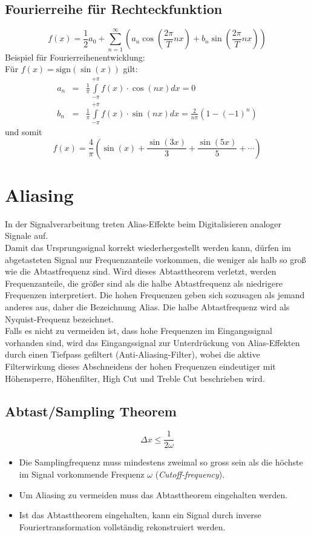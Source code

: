 \subsection{Fourierreihe für Rechteckfunktion}
$$f(x) = \frac{1}{2} a_0 + \sum\limits_{n=1}^{\infty} \left( a_n \cos( \frac{2 \pi}{T} nx) + b_n \sin (\frac{2 \pi}{T} nx) \right)$$
Beispiel für Fourierreihenentwicklung: \\
Für $f(x) = \textrm{sign}(\sin(x))$ gilt:
\begin{eqnarray*}
a_n &=& \frac{1}{\pi} \int\limits_{- \pi}^{+ \pi} f(x) \cdot \cos(nx) dx = 0 \\
b_n &=& \frac{1}{\pi} \int\limits_{- \pi}^{+ \pi} f(x) \cdot \sin(nx) dx = \frac{2}{n \pi} (1 - (-1)^n)
\end{eqnarray*}
und somit $$f(x) = \frac{4}{\pi} \left( \sin(x) + \frac{\sin(3x)}{3} + \frac{\sin(5x)}{5} + \cdots \right)$$

\section{Aliasing}
In der Signalverarbeitung treten Alias-Effekte beim Digitalisieren analoger Signale auf. \\
Damit das Ursprungssignal korrekt wiederhergestellt werden kann, dürfen im abgetasteten Signal nur Frequenzanteile vorkommen, die weniger als halb so groß wie die Abtastfrequenz sind. Wird dieses Abtasttheorem verletzt, werden Frequenzanteile, die größer sind als die halbe Abtastfrequenz als niedrigere Frequenzen interpretiert. Die hohen Frequenzen geben sich sozusagen als jemand anderes aus, daher die Bezeichnung Alias. Die halbe Abtastfrequenz wird als Nyquist-Frequenz bezeichnet. \\
Falls es nicht zu vermeiden ist, dass hohe Frequenzen im Eingangssignal vorhanden sind, wird das Eingangssignal zur Unterdrückung von Alias-Effekten durch einen Tiefpass gefiltert (Anti-Aliasing-Filter), wobei die aktive Filterwirkung dieses Abschneidens der hohen Frequenzen eindeutiger mit Höhensperre, Höhenfilter, High Cut und Treble Cut beschrieben wird.

\subsection{Abtast/Sampling Theorem}
$$\Delta x \leq \frac{1}{2 \omega}$$
\begin{itemize}
\item Die Samplingfrequenz muss mindestens zweimal so gross sein als die höchste im Signal vorkommende Frequenz $\omega$ (\textsl{Cutoff-frequency}).
\item Um Aliasing zu vermeiden muss das Abtasttheorem eingehalten werden.
\item Ist das Abtasttheorem eingehalten, kann ein Signal durch inverse Fouriertransformation vollständig rekonstruiert werden.
\end{itemize}

